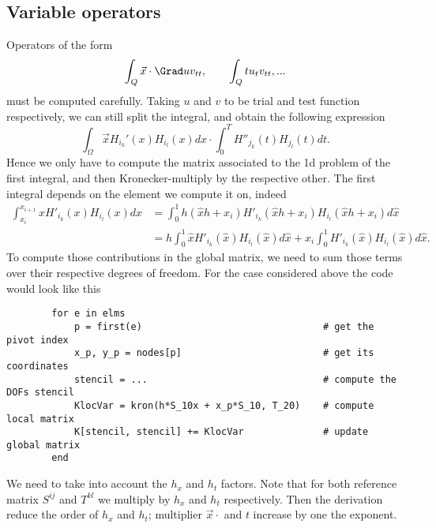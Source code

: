 \documentclass[]{report}
\begin{document}
    \subsection*{Variable operators}
    Operators of the form 
    \begin{equation*}
        \int_Q \vec{x} \cdot \Grad u v_{tt}, \qquad \int_Q t u_t v_{tt}, ...
    \end{equation*}
    must be computed carefully. Taking $u$ and $v$ to be trial and test function respectively, we can still split the integral, and obtain the following expression
    \begin{equation*}
        \int_{\Omega} \vec{x} H_{i_k}'(x) H_{i_l}(x) dx \cdot \int_0^T H''_{j_k}(t) H_{j_l}(t) dt.
    \end{equation*}
    Hence we only have to compute the matrix associated to the 1d problem of the first integral, and then Kronecker-multiply by the respective other. The first integral depends on the element we compute it on, indeed
    \begin{align*}
        \int_{x_i}^{x_{i+1}} x H'_{i_k}(x) H_{i_l}(x) dx &= \int_0^1 h (\hat{x}h + x_i) H'_{i_k}(\hat{x}h + x_i) H_{i_l}(\hat{x}h + x_i) d\hat{x} \\
        &= h \int_0^1 \hat{x} H'_{i_k}(\hat{x})H_{i_l}(\hat{x}) d\hat{x} + x_i \int_0^1 H'_{i_k}(\hat{x})H_{i_l}(\hat{x}) d\hat{x}.
    \end{align*}
    To compute those contributions in the global matrix, we need to sum those terms over their respective degrees of freedom. For the case considered above the code would look like this
    \begin{verbatim}
        for e in elms
            p = first(e)                                # get the pivot index
            x_p, y_p = nodes[p]                         # get its coordinates
            stencil = ...                               # compute the DOFs stencil
            KlocVar = kron(h*S_10x + x_p*S_10, T_20)    # compute local matrix
            K[stencil, stencil] += KlocVar              # update global matrix
        end
    \end{verbatim}

    We need to take into account the $h_x$ and $h_t$ factors. Note that for both reference matrix $S^{ij}$ and $T^{kl}$ we multiply by $h_x$ and $h_t$ respectively. Then the derivation reduce the order of $h_x$ and $h_t$; multiplier $\vec{x} \cdot$ and $t$ increase by one the exponent.
\end{document}
